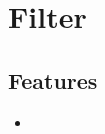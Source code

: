\section{Filter}
\label{module:Filter}
\ClearAPI
\TODO
\subsection{Features}
\begin{itemize}
	\item \TODO
\end{itemize}